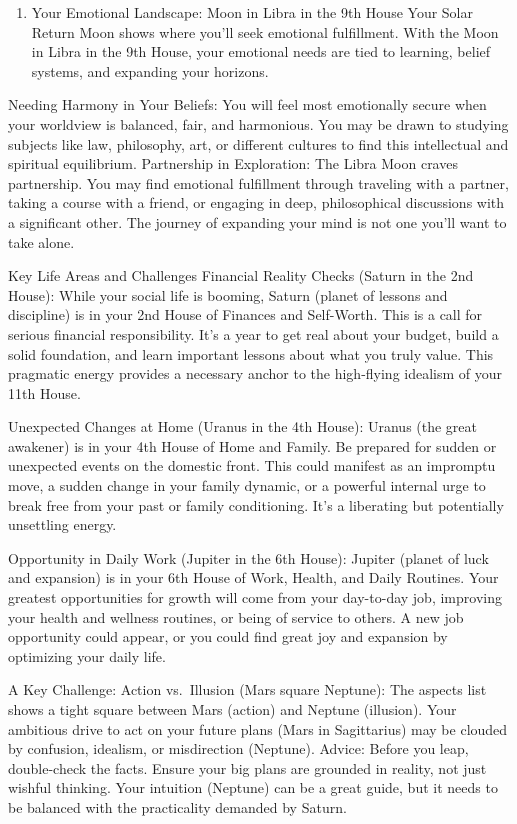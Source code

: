 \documentclass{article}
\begin{document}
\begin{enumerate}
\def\labelenumi{\arabic{enumi}.}
\setcounter{enumi}{2}
\tightlist
\item
  Your Emotional Landscape: Moon in Libra in the 9th House Your Solar
  Return Moon shows where you'll seek emotional fulfillment. With the
  Moon in Libra in the 9th House, your emotional needs are tied to
  learning, belief systems, and expanding your horizons.
\end{enumerate}

Needing Harmony in Your Beliefs: You will feel most emotionally secure
when your worldview is balanced, fair, and harmonious. You may be drawn
to studying subjects like law, philosophy, art, or different cultures to
find this intellectual and spiritual equilibrium. Partnership in
Exploration: The Libra Moon craves partnership. You may find emotional
fulfillment through traveling with a partner, taking a course with a
friend, or engaging in deep, philosophical discussions with a
significant other. The journey of expanding your mind is not one you'll
want to take alone.

Key Life Areas and Challenges Financial Reality Checks (Saturn in the
2nd House): While your social life is booming, Saturn (planet of lessons
and discipline) is in your 2nd House of Finances and Self-Worth. This is
a call for serious financial responsibility. It's a year to get real
about your budget, build a solid foundation, and learn important lessons
about what you truly value. This pragmatic energy provides a necessary
anchor to the high-flying idealism of your 11th House.

Unexpected Changes at Home (Uranus in the 4th House): Uranus (the great
awakener) is in your 4th House of Home and Family. Be prepared for
sudden or unexpected events on the domestic front. This could manifest
as an impromptu move, a sudden change in your family dynamic, or a
powerful internal urge to break free from your past or family
conditioning. It's a liberating but potentially unsettling energy.

Opportunity in Daily Work (Jupiter in the 6th House): Jupiter (planet of
luck and expansion) is in your 6th House of Work, Health, and Daily
Routines. Your greatest opportunities for growth will come from your
day-to-day job, improving your health and wellness routines, or being of
service to others. A new job opportunity could appear, or you could find
great joy and expansion by optimizing your daily life.

A Key Challenge: Action vs.~Illusion (Mars square Neptune): The aspects
list shows a tight square between Mars (action) and Neptune (illusion).
Your ambitious drive to act on your future plans (Mars in Sagittarius)
may be clouded by confusion, idealism, or misdirection (Neptune).
Advice: Before you leap, double-check the facts. Ensure your big plans
are grounded in reality, not just wishful thinking. Your intuition
(Neptune) can be a great guide, but it needs to be balanced with the
practicality demanded by Saturn.
\end{document}
